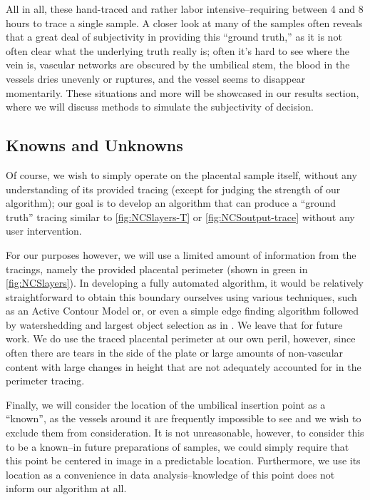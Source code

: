 All in all, these hand-traced and rather labor intensive--requiring between 4 and 8 hours to trace a single sample. A closer look at many of the samples often reveals that a great deal of subjectivity in providing this ``ground truth,'' as it is not often clear what the underlying truth really is; often it's hard to see where the vein is, vascular networks are obscured by the umbilical stem, the blood in the vessels dries unevenly or ruptures, and the vessel seems to disappear momentarily. These situations and more will be showcased in our results section, where we will discuss methods to simulate the subjectivity of decision.


\subsection{Knowns and Unknowns}
Of course, we wish to simply operate on the placental sample itself, without any understanding of its provided tracing (except for judging the strength of our algorithm);
our goal is to develop an algorithm that can produce a ``ground truth'' tracing similar to \cref{fig:NCSlayers-T} or \cref{fig:NCSoutput-trace} without any user intervention.

For our purposes however, we will use a limited amount of information from the tracings, namely the provided placental perimeter (shown in green in \cref{fig:NCSlayers}). In developing a fully automated algorithm, it would be relatively straightforward to obtain this boundary ourselves using various techniques, such as an Active Contour Model \cite{activecontours} or, or even a simple edge finding algorithm followed by watershedding and largest object selection as in \cite{huynh2013filter}. We leave that for future work. We do use the traced placental perimeter at our own peril, however, since often there are tears in the side of the plate or large amounts of non-vascular content with large changes in height that are not adequately accounted for in the perimeter tracing.

Finally, we will consider the location of the umbilical insertion point as a ``known'', as the vessels around it are frequently impossible to see and we wish to exclude them from consideration. It is not unreasonable, however, to consider this to be a known--in future preparations of samples, we could simply require that this point be centered in image in a predictable location. Furthermore, we use its location as a convenience in data analysis--knowledge of this point does not inform our algorithm at all.


